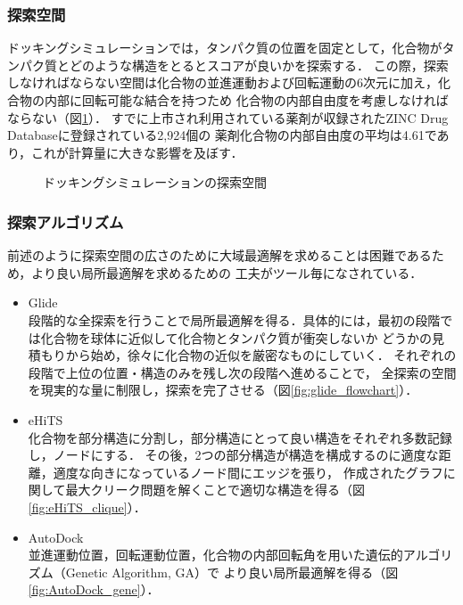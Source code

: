 \subsubsection{探索空間}
ドッキングシミュレーションでは，タンパク質の位置を固定として，化合物がタンパク質とどのような構造をとるとスコアが良いかを探索する．
この際，探索しなければならない空間は化合物の並進運動および回転運動の6次元に加え，化合物の内部に回転可能な結合を持つため
化合物の内部自由度を考慮しなければならない（図\ref{fig:docking_freedom}）．
すでに上市され利用されている薬剤が収録されたZINC Drug Databaseに登録されている2,924個の
薬剤化合物の内部自由度の平均は4.61であり，これが計算量に大きな影響を及ぼす．

\begin{figure}[tb]
 \begin{center}
  \caption{ドッキングシミュレーションの探索空間}
  \label{fig:docking_freedom}
 \end{center}
\end{figure}


\subsubsection{探索アルゴリズム}
前述のように探索空間の広さのために大域最適解を求めることは困難であるため，より良い局所最適解を求めるための
工夫がツール毎になされている．
\begin{itemize}
\item Glide\cite{Friesner2004}\\
	段階的な全探索を行うことで局所最適解を得る．具体的には，最初の段階では化合物を球体に近似して化合物とタンパク質が衝突しないか
	どうかの見積もりから始め，徐々に化合物の近似を厳密なものにしていく．
	それぞれの段階で上位の位置・構造のみを残し次の段階へ進めることで，
	全探索の空間を現実的な量に制限し，探索を完了させる（図\ref{fig:glide_flowchart}）．
\item eHiTS\cite{Zsoldos2007}\\
	化合物を部分構造に分割し，部分構造にとって良い構造をそれぞれ多数記録し，ノードにする．
	その後，2つの部分構造が構造を構成するのに適度な距離，適度な向きになっているノード間にエッジを張り，
	作成されたグラフに関して最大クリーク問題を解くことで適切な構造を得る（図\ref{fig:eHiTS_clique}）．
\item AutoDock\cite{Morris2009}\\
	並進運動位置，回転運動位置，化合物の内部回転角を用いた遺伝的アルゴリズム（Genetic Algorithm, GA）で
	より良い局所最適解を得る（図\ref{fig:AutoDock_gene}）．
\end{itemize}


